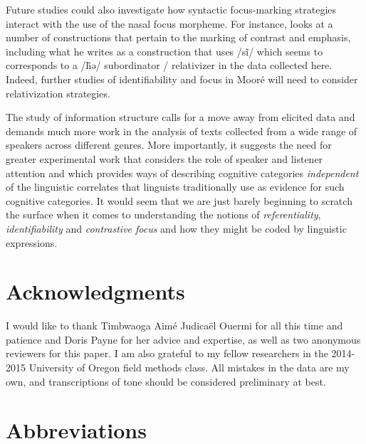 \documentclass[output=paper]{langsci/langscibook}
\begin{document}
Future studies could also investigate how syntactic focus-marking strategies interact with the use of the nasal focus morpheme. For instance, \citet[445-450]{Kabore1985} looks at a number of constructions that pertain to the marking of contrast and emphasis, including what he writes as a construction that uses /s\~{i}/ which seems to corresponds to a /h̃ə/ subordinator / relativizer in the data collected here. Indeed, further studies of identifiability and focus in Mooré will need to consider relativization strategies.

The study of information structure calls for a move away from elicited data and demands much more work in the analysis of texts collected from a wide range of speakers across different genres. More importantly, it suggests the need for greater experimental work that considers the role of speaker and listener attention and which provides ways of describing cognitive categories \textit{independent} of the linguistic correlates that linguists traditionally use as evidence for such cognitive categories. It would seem that we are just barely beginning to scratch the surface when it comes to understanding the notions of \textit{referentiality}, \textit{identifiability} and \textit{contrastive focus} and how they might be coded by linguistic expressions.

\section*{\textbf{Acknowledgments}}

I would like to thank Timbwaoga Aimé Judicaël Ouermi for all this time and patience and Doris Payne for her advice and expertise, as well as two anonymous reviewers for this paper. I am also grateful to my fellow researchers in the 2014-2015 University of Oregon field methods class. All mistakes in the data are my own, and transcriptions of tone should be considered preliminary at best.

\section*{Abbreviations}
\end{document}
